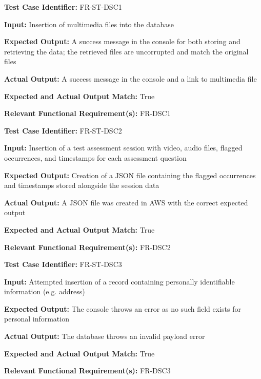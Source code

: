 \documentclass[12pt, titlepage]{article}
\begin{document}
\begin{mdframed}[linewidth=0.5mm] \par
  \textbf{Test Case Identifier:} FR-ST-DSC1 \par
  \textbf{Input:} Insertion of multimedia files into the database \par
  \textbf{Expected Output:} A success message in the console for both storing and retrieving the data; the retrieved files are uncorrupted and match the original files \par
  \textbf{Actual Output:} A success message in the console and a link to multimedia file \par
  \textbf{Expected and Actual Output Match:} True \par
  \textbf{Relevant Functional Requirement(s):} FR-DSC1
\end{mdframed}

\begin{mdframed}[linewidth=0.5mm] \par
  \textbf{Test Case Identifier:} FR-ST-DSC2 \par
  \textbf{Input:} Insertion of a test assessment session with video, audio files, flagged occurrences, and timestamps for each assessment question \par
  \textbf{Expected Output:} Creation of a JSON file containing the flagged occurrences and timestamps stored alongside the session data \par
  \textbf{Actual Output:} A JSON file was created in AWS with the correct expected output \par
  \textbf{Expected and Actual Output Match:} True \par
  \textbf{Relevant Functional Requirement(s):} FR-DSC2
\end{mdframed}

\begin{mdframed}[linewidth=0.5mm] \par
  \textbf{Test Case Identifier:} FR-ST-DSC3 \par
  \textbf{Input:} Attempted insertion of a record containing personally identifiable information (e.g. address) \par
  \textbf{Expected Output:} The console throws an error as no such field exists for personal information \par
  \textbf{Actual Output:} The database throws an invalid payload error\par
  \textbf{Expected and Actual Output Match:} True \par
  \textbf{Relevant Functional Requirement(s):} FR-DSC3
\end{mdframed}
\end{document}
